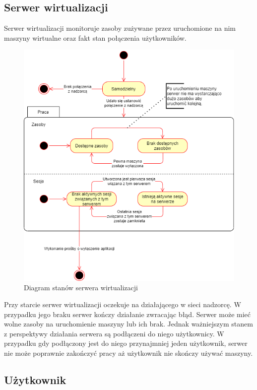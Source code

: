 \documentclass[../opis-rozwiazania.tex]{subfiles}
\begin{document}
\subsection{Serwer wirtualizacji}

Serwer wirtualizacji monitoruje zasoby zużywane przez uruchomione na nim maszyny wirtualne oraz fakt stan połączenia użytkowników.

\begin{figure}[H]
  \centering
  \includegraphics[width=\textwidth]{../diagrams/state_diagrams/virtualisation_server.png}
  \caption{Diagram stanów serwera wirtualizacji}
  \label{state_virtsrv}
\end{figure}

Przy starcie serwer wirtualizacji oczekuje na działającego w sieci nadzorcę.
W przypadku jego braku serwer kończy działanie zwracając błąd.
Serwer może mieć wolne zasoby na uruchomienie maszyny lub ich brak.
Jednak ważniejszym stanem z perspektywy działania serwera są podłączeni do niego użytkownicy.
W przypadku gdy podłączony jest do niego przynajmniej jeden użytkownik, serwer nie może poprawnie zakończyć pracy aż użytkownik nie skończy używać maszyny.

\subsection{Użytkownik}
\end{document}
